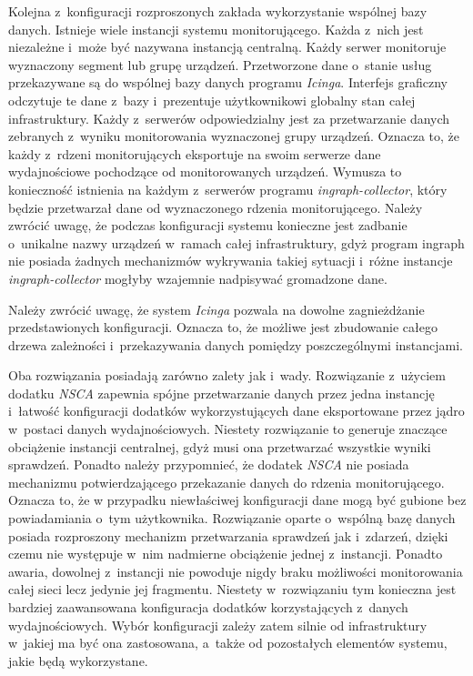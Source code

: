 Kolejna z~konfiguracji rozproszonych zakłada wykorzystanie wspólnej
bazy danych. Istnieje wiele instancji systemu monitorującego. Każda
z~nich jest niezależne i~może być nazywana instancją centralną. Każdy
serwer monitoruje wyznaczony segment lub grupę urządzeń. Przetworzone
dane o~stanie usług przekazywane są do wspólnej bazy danych programu
{\em Icinga}. Interfejs graficzny odczytuje te dane z~bazy i~prezentuje
użytkownikowi globalny stan całej infrastruktury. Każdy z~serwerów
odpowiedzialny jest za przetwarzanie danych zebranych z~wyniku
monitorowania wyznaczonej grupy urządzeń. Oznacza to, że każdy
z~rdzeni monitorujących eksportuje na swoim serwerze dane
wydajnościowe pochodzące od monitorowanych urządzeń. Wymusza to
konieczność istnienia na każdym z~serwerów programu {\em ingraph-collector},
który będzie przetwarzał dane od wyznaczonego rdzenia
monitorującego. Należy zwrócić uwagę, że podczas konfiguracji systemu
konieczne jest zadbanie o~unikalne nazwy urządzeń w~ramach całej
infrastruktury, gdyż program ingraph nie posiada żadnych mechanizmów
wykrywania takiej sytuacji i~różne instancje {\em ingraph-collector} mogłyby
wzajemnie nadpisywać gromadzone dane.

Należy zwrócić uwagę, że system {\em Icinga} pozwala na dowolne
zagnieżdżanie przedstawionych konfiguracji. Oznacza to, że możliwe jest
zbudowanie całego drzewa zależności i~przekazywania danych pomiędzy
poszczególnymi instancjami.

Oba rozwiązania posiadają zarówno zalety jak i~wady. Rozwiązanie
z~użyciem dodatku {\em NSCA} zapewnia spójne przetwarzanie danych przez
jedna instancję i~łatwość konfiguracji dodatków wykorzystujących dane
eksportowane przez jądro w~postaci danych wydajnościowych. Niestety
rozwiązanie to generuje znaczące obciążenie instancji centralnej, gdyż
musi ona przetwarzać wszystkie wyniki sprawdzeń. Ponadto należy
przypomnieć, że dodatek {\em NSCA} nie posiada mechanizmu potwierdzającego
przekazanie danych do rdzenia monitorującego. Oznacza to, że w
przypadku niewłaściwej konfiguracji dane mogą być gubione bez
powiadamiania o~tym użytkownika. Rozwiązanie oparte o~wspólną bazę
danych posiada rozproszony mechanizm przetwarzania sprawdzeń jak
i~zdarzeń, dzięki czemu nie występuje w~nim nadmierne obciążenie
jednej z~instancji. Ponadto awaria, dowolnej z~instancji nie powoduje
nigdy braku możliwości monitorowania całej sieci lecz jedynie jej
fragmentu. Niestety w~rozwiązaniu tym konieczna jest bardziej
zaawansowana konfiguracja dodatków korzystających z~danych
wydajnościowych. Wybór konfiguracji zależy zatem silnie od
infrastruktury w~jakiej ma być ona zastosowana, a~także od pozostałych
elementów systemu, jakie będą wykorzystane.


